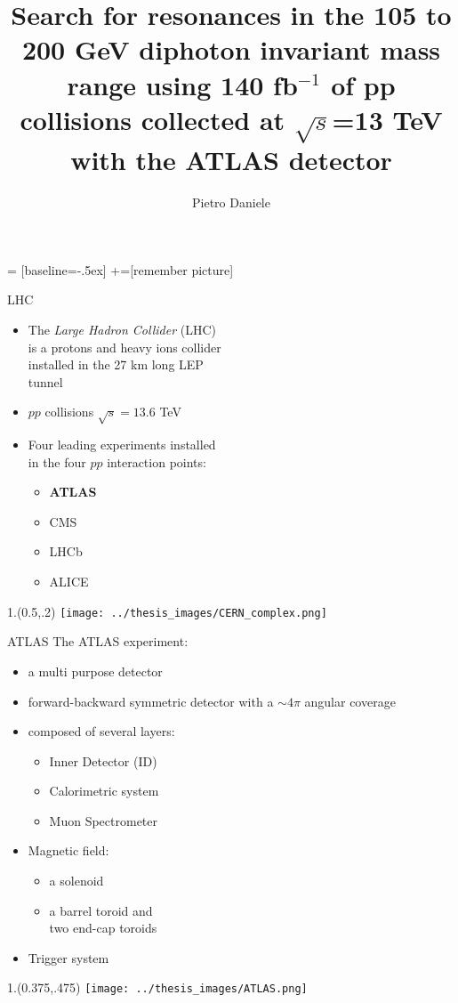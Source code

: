 \documentclass[10pt,UKenglish, leqno, xcolor = dvipsnames]{beamer}
\author{Pietro Daniele}
\title{\large Search for resonances in the 105 to 200 GeV diphoton invariant mass range using 140 fb$^{-1}$ of pp collisions collected at $\sqrt{s}$=13 TeV with the ATLAS detector}
\begin{document}
	 = [baseline=-.5ex]
	+=[remember picture]
	
	\begin{frame}{LHC}
		\vfill
		\begin{itemize}
			\item The \textit{Large Hadron Collider} (LHC) \\is a protons and heavy ions collider\\ installed in the 27 km long LEP \\tunnel
			\item $pp$ collisions $\sqrt{s} = 13.6$ TeV
			\item Four leading experiments installed\\ in the four $pp$ interaction points:
			\begin{itemize}
				\item \textbf{ATLAS}
				\item CMS
				\item LHCb
				\item ALICE
			\end{itemize}
		\end{itemize}
		\vfill
		\begin{textblock}{1.}(0.5,.2)
			\texttt{[image: ../thesis\_images/CERN\_complex.png]}
		\end{textblock}
	\end{frame}

	\begin{frame}{ATLAS}
		\vfill
		The ATLAS experiment:
		\begin{itemize}
			\item a multi purpose detector
			\item forward-backward symmetric detector with a $\sim4\pi$ angular coverage
			\item composed of several layers:
			\begin{itemize}
				\item Inner Detector (ID)
				\item Calorimetric system
				\item Muon Spectrometer
			\end{itemize}
			\item Magnetic field:
			\begin{itemize}
				\item a solenoid
				\item a barrel toroid and\\ two end-cap toroids
			\end{itemize}
			\item Trigger system
			
		\end{itemize}
		\vfill
		\begin{textblock}{1.}(0.375,.475)
			\texttt{[image: ../thesis\_images/ATLAS.png]}
		\end{textblock}
	\end{frame}
\end{document}
